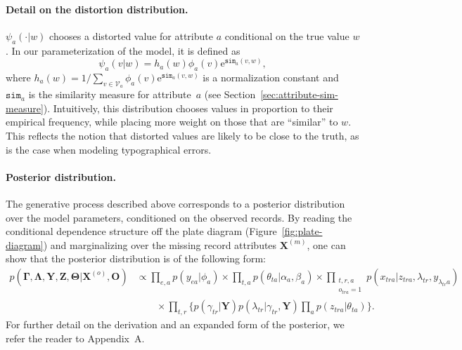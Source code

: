 \documentclass[12pt,letterpaper]{article}
\renewcommand\vec{\bm}
\newcommand{\simfn}{\mathtt{sim}} %
\newcommand{\valset}{\mathcal{V}} %
\newcommand{\1}[1]{\mathbb{I}\!\left[#1\right]} %
\newcommand{\euler}{\mathrm{e}} %
\begin{document}
\paragraph{Detail on the distortion distribution.} $\psi_{a}(\cdot|w)$ 
chooses a distorted value for attribute $a$ conditional on 
the true value $w$.
In our parameterization of the model, it is defined as
\begin{equation}
\psi_{a}(v|w) = h_{a}(w) \phi_{a}(v) \euler^{\simfn_{a}(v,w)},
\label{eqn:distortion-dist}
\end{equation}
where $h_{a}(w) = 1 / \sum_{v \in \valset_{a}} \phi_{a}(v) 
\euler^{\simfn_{a}(v,w)}$ is a normalization constant and 
$\simfn_{a}$ is the similarity measure for attribute~$a$
(see Section~\ref{sec:attribute-sim-measure}).
Intuitively, this distribution chooses values in proportion to 
their empirical frequency, while placing more weight on those 
that are ``similar'' to $w$.
This reflects the notion that distorted values are likely 
to be close to the truth, as is the case when modeling
typographical errors.

\paragraph{Posterior distribution.} 
The generative process described above corresponds to a posterior distribution 
over the model parameters, conditioned on the observed records. 
By reading the conditional dependence structure off the plate diagram 
(Figure~\ref{fig:plate-diagram}) and marginalizing over 
the missing record attributes $\vec{X}^{(m)}$, one can show that the 
posterior distribution is of the following form:
\begin{equation}
\begin{split}
p(\vec{\Gamma}, \vec{\Lambda}, \vec{Y}, \vec{Z}, \vec{\Theta}|\vec{X}^{(o)}, \vec{O}) 
& \propto \prod_{e, a} p(y_{ea}|\phi_{a}) \times \prod_{t, a} p(\theta_{ta}|\alpha_{a}, \beta_{a}) \times \prod_{\substack{t, r, a\\o_{tra}=1}} p(x_{tra}|z_{tra}, \lambda_{tr}, y_{\lambda_{tr}a}) \\
& \qquad {} \times \prod_{t, r} \Big\{ p(\gamma_{tr}|\vec{Y}) 
p(\lambda_{tr}|\gamma_{tr}, \vec{Y}) \prod_{a} p(z_{tra}|\theta_{ta}) \Big\}.
\end{split} 
\label{eqn:partitioned-posterior}
\end{equation}
For further detail on the derivation and an expanded form of the 
posterior, we refer the reader to Appendix~A.
\end{document}
